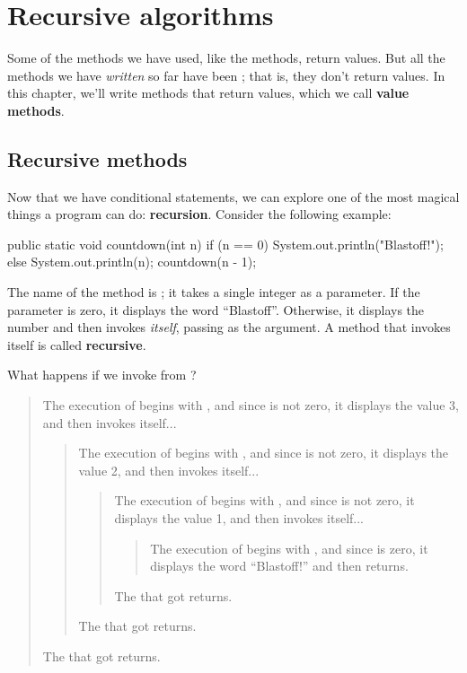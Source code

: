 \chapter{Recursive algorithms}


Some of the methods we have used, like the  methods, return values.
But all the methods we have {\em written} so far have been ; that is, they don't return values.
In this chapter, we'll write methods that return values, which we call {\bf value methods}.


\section{Recursive methods}
\label{recursion}


Now that we have conditional statements, we can explore one of the most magical things a program can do: {\bf recursion}.
Consider the following example:

\begin{code}
public static void countdown(int n) {
    if (n == 0) {
        System.out.println("Blastoff!");
    } else {
        System.out.println(n);
        countdown(n - 1);
    }
}
\end{code}


The name of the method is ; it takes a single integer as a parameter.
If the parameter is zero, it displays the word ``Blastoff''.
Otherwise, it displays the number and then invokes {\em itself}, passing  as the argument.
A method that invokes itself is called {\bf recursive}.

What happens if we invoke  from ?

\vspace{-1ex}
\begin{quote}
The execution of  begins with , and since  is not zero, it displays the value 3, and then invokes itself...
\begin{quote}
The execution of  begins with , and since  is not zero, it displays the value 2, and then invokes itself...
\begin{quote}
The execution of  begins with , and since  is not zero, it displays the value 1, and then invokes itself...
\begin{quote}
The execution of  begins with , and since  is zero, it displays the word ``Blastoff!'' and then returns.
\end{quote}
The  that got  returns.
\end{quote}
The  that got  returns.
\end{quote}
The  that got  returns.
\end{quote}
\vspace{-1ex}

